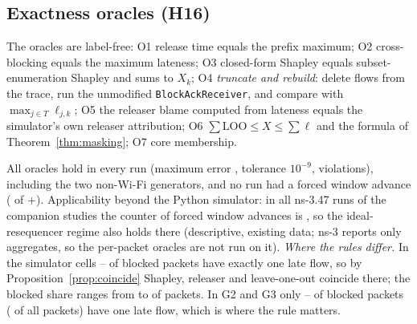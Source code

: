 \documentclass[11pt]{article}
\newcommand{\tagC}{\textsc{conf}}
\theoremstyle{definition}
\begin{document}
\subsection{Exactness oracles (H16)}\label{sec:val-exact}
The oracles are label-free: O1 release time equals the prefix maximum; O2 cross-blocking equals the maximum lateness; O3 closed-form Shapley equals subset-enumeration Shapley and sums to $X_k$; O4 \emph{truncate and rebuild}: delete flows from the trace, run the unmodified \texttt{BlockAckReceiver}, and compare with $\max_{j\in T}\ell_{j,k}$; O5 the releaser blame computed from lateness equals the simulator's own releaser attribution; O6 $\sum\mathrm{LOO}\le X\le\sum\ell$ and the formula of Theorem~\ref{thm:masking}; O7 core membership.
\begin{table}[h]
\centering\footnotesize

\caption{H16 (\tagC{}): oracle errors over all runs. ``one late flow'' is the share of blocked packets with exactly one late flow. The maximum error is over O1--O6; tolerance $10^{-9}$; O6/O7 violation counts are \FvViol{}. Cells are (load multiplier, link-2 extra delay in ms).}
\end{table}
All oracles hold in every run (maximum error \FvMaxErr{}, tolerance $10^{-9}$, \FvViol{} violations), including the two non-Wi-Fi generators, and no run had a forced window advance (\FvForcedRuns{} of \FvSimRuns{}+\FvGenRuns{}). Applicability beyond the Python simulator: in all \FvNsRuns{} ns-3.47 runs of the companion studies the counter of forced window advances is \FvNsForced{}, so the ideal-resequencer regime also holds there (descriptive, existing data; ns-3 reports only aggregates, so the per-packet oracles are not run on it).
\emph{Where the rules differ.} In the simulator cells \FvSingleSimMin{}--\FvSingleSimMax{} of blocked packets have exactly one late flow, so by Proposition~\ref{prop:coincide} Shapley, releaser and leave-one-out coincide there; the blocked share ranges from \FvBlockedSimMin{} to \FvBlockedSimMax{} of packets. In G2 and G3 only \FvSingleGenA{}--\FvSingleGenB{} of blocked packets (\FvBlockedGen{} of all packets) have one late flow, which is where the rule matters.
\end{document}
